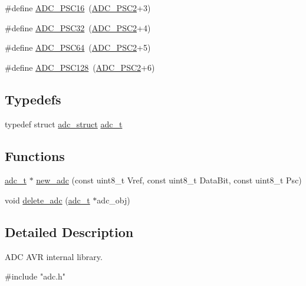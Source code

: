 \begin{DoxyCompactItemize}
\item 
\#define \hyperlink{group__ex4__adc_ga4d372cc3fd8e1590ba3c73d22d54115c}{A\-D\-C\-\_\-\-P\-S\-C16}~(\hyperlink{group__ex4__adc_ga17dcbe58ddaee17c0a9240f875c5fafa}{A\-D\-C\-\_\-\-P\-S\-C2}+3)
\item 
\#define \hyperlink{group__ex4__adc_ga0e7e1b2aaf0da2d28cabe6ed160da553}{A\-D\-C\-\_\-\-P\-S\-C32}~(\hyperlink{group__ex4__adc_ga17dcbe58ddaee17c0a9240f875c5fafa}{A\-D\-C\-\_\-\-P\-S\-C2}+4)
\item 
\#define \hyperlink{group__ex4__adc_ga20fdb2079b33236cb1c64bbe68677c4d}{A\-D\-C\-\_\-\-P\-S\-C64}~(\hyperlink{group__ex4__adc_ga17dcbe58ddaee17c0a9240f875c5fafa}{A\-D\-C\-\_\-\-P\-S\-C2}+5)
\item 
\#define \hyperlink{group__ex4__adc_ga0d1ee1a83dd4cc2104ddb943a06b881b}{A\-D\-C\-\_\-\-P\-S\-C128}~(\hyperlink{group__ex4__adc_ga17dcbe58ddaee17c0a9240f875c5fafa}{A\-D\-C\-\_\-\-P\-S\-C2}+6)
\end{DoxyCompactItemize}
\subsection*{Typedefs}
\begin{DoxyCompactItemize}
\item 
typedef struct \hyperlink{structadc__struct}{adc\-\_\-struct} \hyperlink{group__ex4__adc_ga31d20334b42de2bbff807124b0984a90}{adc\-\_\-t}
\end{DoxyCompactItemize}
\subsection*{Functions}
\begin{DoxyCompactItemize}
\item 
\hyperlink{group__ex4__adc_ga31d20334b42de2bbff807124b0984a90}{adc\-\_\-t} $\ast$ \hyperlink{group__ex4__adc_ga91d781b98c410d6e5ccc290e20f989d5}{new\-\_\-adc} (const uint8\-\_\-t Vref, const uint8\-\_\-t Data\-Bit, const uint8\-\_\-t Psc)
\item 
void \hyperlink{group__ex4__adc_gaee86604d9a26fc96badb43239e639c38}{delete\-\_\-adc} (\hyperlink{group__ex4__adc_ga31d20334b42de2bbff807124b0984a90}{adc\-\_\-t} $\ast$adc\-\_\-obj)
\end{DoxyCompactItemize}


\subsection{Detailed Description}
A\-D\-C A\-V\-R internal library. 
\begin{DoxyCode}
\textcolor{preprocessor}{ #include "adc.h"} 
\end{DoxyCode}


